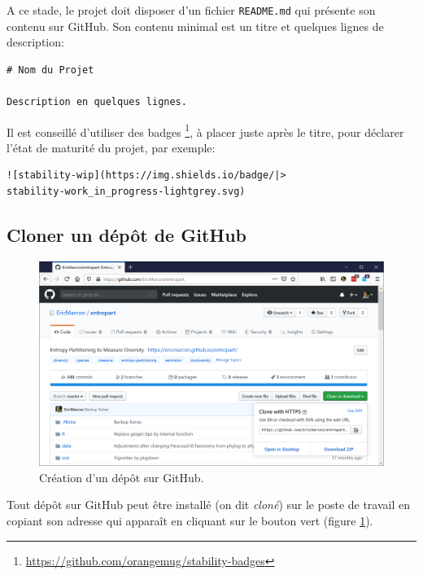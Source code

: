 \documentclass[
  11pt,
  french,
  a4paper,
  extrafontsizes,onecolumn,openright
  ]{memoir}
\begin{document}
A ce stade, le projet doit disposer d'un fichier \texttt{README.md} qui présente son contenu sur GitHub.
Son contenu minimal est un titre et quelques lignes de description:

\begin{verbatim}
# Nom du Projet

Description en quelques lignes.
\end{verbatim}

Il est conseillé d'utiliser des badges \footnote{\url{https://github.com/orangemug/stability-badges}}, à placer juste après le titre, pour déclarer l'état de maturité du projet, par exemple:

\begin{verbatim}
![stability-wip](https://img.shields.io/badge/|>
stability-work_in_progress-lightgrey.svg)
\end{verbatim}

\hypertarget{cloner-un-duxe9puxf4t-de-github}{%
\subsection{Cloner un dépôt de GitHub}\label{cloner-un-duxe9puxf4t-de-github}}



\scriptsize

\begin{figure}

{\centering \includegraphics[width=0.8\linewidth]{images/git-Clone} 

}

\caption{Création d'un dépôt sur GitHub.}\label{fig:git-Clone}
\end{figure}

\normalsize

Tout dépôt sur GitHub peut être installé (on dit \emph{cloné}) sur le poste de travail en copiant son adresse qui apparaît en cliquant sur le bouton vert (figure \ref{fig:git-Clone}).
\end{document}

